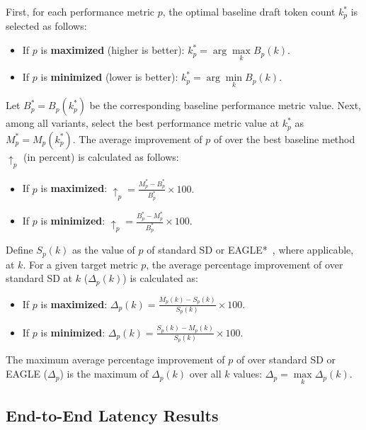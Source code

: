 First, for each performance metric $p$, the optimal baseline draft token count $k_p^*$ is selected as follows:
\begin{itemize}
    \item If $p$ is \textbf{maximized} (higher is better): $k_p^*=\arg\max\limits_k B_p(k).$

    \item If $p$ is \textbf{minimized} (lower is better):
    $
    k_p^*=\arg\min\limits_k B_p(k).
    $
\end{itemize}
Let $B_p^* = B_p(k_p^*)$ be the corresponding baseline performance metric value. Next, among all \alg{} variants, select the best \alg{} performance metric value at $k_p^*$ as $M_p^* = M_p(k_p^*)$. The average improvement of $p$ of \alg{} over the best baseline method $\uparrow_p$ (in percent) is calculated as follows:
\begin{itemize}
    \item If $p$ is \textbf{maximized}:
    $
    \uparrow_p=\frac{M_p^*-B_p^*}{B_p^*}\times 100.
    $
    \item If $p$ is \textbf{minimized}:
    $
    \uparrow_p=\frac{B_p^*-M_p^*}{B_p^*}\times 100.
    $
\end{itemize}

Define $S_p(k)$ as the value of $p$ of standard SD or EAGLE*~\citep{li2024eagle,li2024eagle2,li2025eagle3}, where applicable, at $k$. For a given target metric $p$, the average percentage improvement of \alg{} over standard SD at $k$ ($\Delta_p(k)$) is calculated as:
\begin{itemize}
    \item If $p$ is \textbf{maximized}:
    $
    \Delta_p(k)=\frac{M_p(k)-S_p(k)}{S_p(k)}\times 100.
    $
    \item If $p$ is \textbf{minimized}:
    $
    \Delta_p(k)=\frac{S_p(k)-M_p(k)}{S_p(k)}\times 100.
    $
\end{itemize}
The maximum average percentage improvement of $p$ of \alg{} over standard SD or EAGLE ($\Delta_p$) is the maximum of $\Delta_p(k)$ over all $k$ values:
$
\Delta_p=\max\limits_k \Delta_p(k).
$



\subsection{End-to-End Latency Results}
\label{app:exp-e2el}

